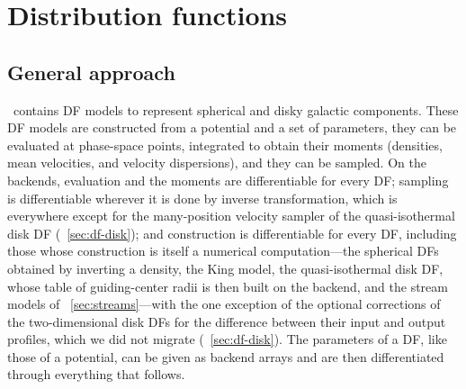 \section{Distribution functions}\label{sec:df}

\subsection{General approach}\label{sec:df-general}

\galpy\ contains DF models to represent spherical and disky galactic components.
These DF models are constructed from a potential and a set of parameters,
they can be evaluated at phase-space points, integrated to obtain their moments 
(densities, mean velocities, and velocity dispersions), and they can be sampled.
On the backends, evaluation and the moments are differentiable for
every DF; sampling is differentiable wherever it is done by inverse
transformation, which is everywhere except for the many-position
velocity sampler of the quasi-isothermal disk DF
(\sectionname~\ref{sec:df-disk}); and construction is differentiable
for every DF, including those whose construction is itself a numerical
computation---the spherical DFs obtained by inverting a density, the
King model, the quasi-isothermal disk DF, whose table of guiding-center
radii is then built on the backend, and the stream models of
\sectionname~\ref{sec:streams}---with the one exception of the
optional corrections of the two-dimensional disk DFs for the difference
between their input and output profiles, which we did not migrate
(\sectionname~\ref{sec:df-disk}). The parameters
of a DF, like those of a potential, can be given as backend arrays and
are then differentiated through everything that follows.

